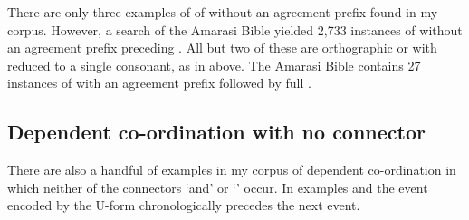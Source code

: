 \begin{exe}
	\label{ex:130921-1, 0.43-0.50}
		\begin{xlist}
		\end{xlist}
\end{exe}

There are only three examples of of 
without an agreement prefix found in my corpus.
However, a search of the Amarasi Bible yielded 2,733
instances of  without an agreement prefix preceding .
All but two of these are orthographic 
or  with  reduced to a single consonant,
as in  above.
The Amarasi Bible contains 27 instances of 
with an agreement prefix followed by full .

\subsection{Dependent co-ordination with no connector}\label{sec:CooCon}
There are also a handful of examples in my corpus
of dependent co-ordination in which neither of the connectors
 `and' or  `' occur.
In examples  and 
the event encoded by the U-form chronologically precedes the next event.

